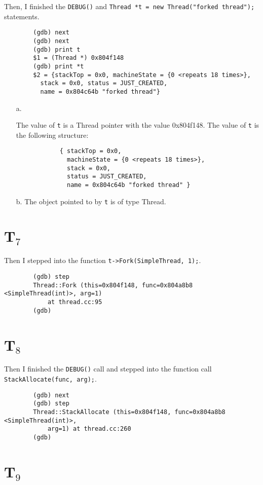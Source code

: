 \documentclass[letterpaper, 10pt]{article}
\begin{document}
	Then, I finished the {\tt DEBUG()} and {\tt Thread *t = new Thread("forked thread");} statements.

	\begin{verbatim}
		(gdb) next
		(gdb) next
		(gdb) print t
		$1 = (Thread *) 0x804f148
		(gdb) print *t
		$2 = {stackTop = 0x0, machineState = {0 <repeats 18 times>},
		  stack = 0x0, status = JUST_CREATED,
		  name = 0x804c64b "forked thread"}
	\end{verbatim}

	\begin{itemize}
		\item[a.]{The value of {\tt t} is a Thread pointer with the value 0x804f148. The value of {\tt *t} is the following structure:
		\begin{verbatim}
			{ stackTop = 0x0,
			  machineState = {0 <repeats 18 times>},
			  stack = 0x0,
			  status = JUST_CREATED,
			  name = 0x804c64b "forked thread" }
		\end{verbatim}}
		\item[b.]{The object pointed to by {\tt t} is of type Thread.}
	\end{itemize}

	\section*{T$_7$}

	Then I stepped into the function {\tt t->Fork(SimpleThread, 1);}.

	\begin{verbatim}
		(gdb) step
		Thread::Fork (this=0x804f148, func=0x804a8b8 <SimpleThread(int)>, arg=1)
			at thread.cc:95
		(gdb)
	\end{verbatim}

	\section*{T$_8$}

	Then I finished the {\tt DEBUG()} call and stepped into the function call {\tt StackAllocate(func, arg);}.

	\begin{verbatim}
		(gdb) next
		(gdb) step
		Thread::StackAllocate (this=0x804f148, func=0x804a8b8 <SimpleThread(int)>,
			arg=1) at thread.cc:260
		(gdb)
	\end{verbatim}

	\section*{T$_9$}
\end{document}
